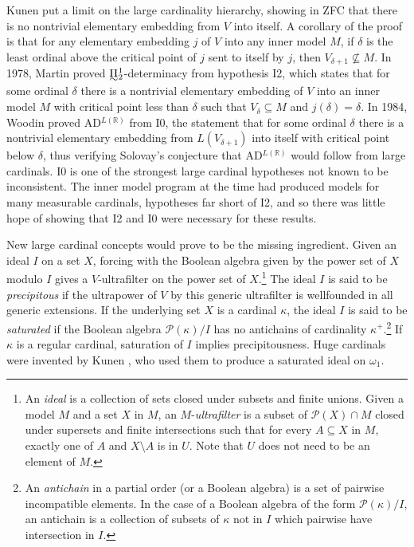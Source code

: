 \documentclass{book}%
\def\underTilde#1{{\baselineskip=0pt\vtop{\hbox{$#1$}\hbox{$\sim$}}}{}}
\newcommand{\uTPi}{\underTilde{\Pi}}
\begin{document}
Kunen  put a limit on the large cardinality hierarchy,
showing in ZFC that there is no nontrivial elementary embedding from
$V$ into itself. A corollary of the proof is that for any elementary
embedding $j$ of $V$ into any inner model $M$, if $\delta$ is the
least ordinal above the critical point of $j$ sent to itself by $j$,
then $V_{\delta + 1} \not\subseteq M$. In 1978, Martin
 proved $\uTPi^{1}_{2}$-determinacy
from hypothesis I2, which states that for some ordinal $\delta$
there is a nontrivial elementary embedding of $V$ into an inner
model $M$ with critical point less than $\delta$ such that
$V_{\delta} \subseteq M$ and $j(\delta) = \delta$. In 1984, Woodin
proved AD$^{L(\mathbb{R})}$ from I0, the
statement that for some ordinal $\delta$ there is a nontrivial
elementary embedding from $L(V_{\delta + 1})$ into itself with
critical point below $\delta$, thus verifying Solovay's
conjecture that AD$^{L(\mathbb{R})}$ would
follow from large cardinals. I0 is one of the strongest large
cardinal hypotheses not known to be inconsistent. The inner model program
at the time had produced models for
many measurable cardinals, hypotheses far short of I2, and so there
was little hope of showing that I2 and I0 were necessary for these
results.

New large cardinal concepts would prove to be the missing
ingredient. Given an ideal $I$ on a set $X$, forcing with the
Boolean algebra given by the power set of $X$ modulo $I$ gives a
$V$-ultrafilter on the power set of $X$.\footnote{An
\emph{ideal} is a collection of sets closed under
subsets and finite unions. Given a model $M$ and a set $X$ in $M$,
an $M$-\emph{ultrafilter} is a subset of
$\mathcal{P}(X) \cap M$ closed under supersets and finite
intersections such that for every $A \subseteq X$ in $M$, exactly one of $A$
and $X \setminus A$ is in $U$. Note that $U$ does not need to be an
element of $M$.} The ideal $I$ is said to be
\emph{precipitous}
if the ultrapower of $V$
by this generic ultrafilter is wellfounded in all generic extensions.
If the underlying set $X$ is a cardinal $\kappa$, the ideal $I$ is
said to be \emph{saturated} if the Boolean algebra
$\mathcal{P}(\kappa)/I$ has no antichains of cardinality
$\kappa^{+}$.\footnote{An \emph{antichain} in a partial order (or a Boolean algebra) is a set of
 pairwise incompatible elements. In the case of a Boolean algebra of the form $\mathcal{P}(\kappa)/I$, an antichain is a collection
 of subsets of $\kappa$ not in $I$ which pairwise have intersection in $I$.} If $\kappa$ is a regular cardinal, saturation of $I$
implies precipitousness. Huge cardinals were invented by Kunen , who used them to
produce a saturated ideal on $\omega_{1}$.
\end{document}
